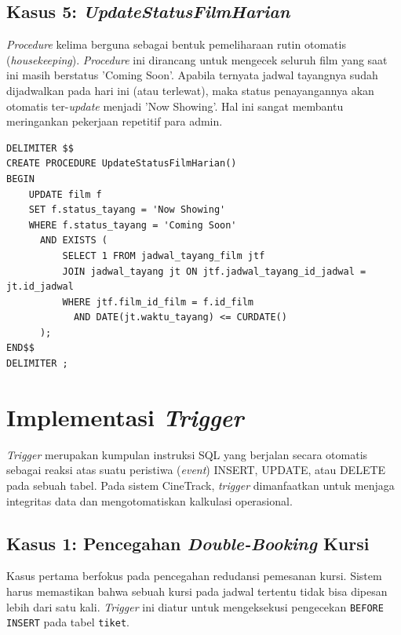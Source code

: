 \documentclass[letter,12pt,bahasa]{article}
\begin{document}
\subsection{Kasus 5: \textit{UpdateStatusFilmHarian}}
\textit{Procedure} kelima berguna sebagai bentuk pemeliharaan rutin otomatis (\textit{housekeeping}). \textit{Procedure} ini dirancang untuk mengecek seluruh film yang saat ini masih berstatus 'Coming Soon'. Apabila ternyata jadwal tayangnya sudah dijadwalkan pada hari ini (atau terlewat), maka status penayangannya akan otomatis ter-\textit{update} menjadi 'Now Showing'. Hal ini sangat membantu meringankan pekerjaan repetitif para admin.

\begin{lstlisting}[style=sql, caption={\textit{Procedure} 5 --- \texttt{UpdateStatusFilmHarian}}, label={lst:proc5}]
DELIMITER $$
CREATE PROCEDURE UpdateStatusFilmHarian()
BEGIN
    UPDATE film f
    SET f.status_tayang = 'Now Showing'
    WHERE f.status_tayang = 'Coming Soon'
      AND EXISTS (
          SELECT 1 FROM jadwal_tayang_film jtf
          JOIN jadwal_tayang jt ON jtf.jadwal_tayang_id_jadwal = jt.id_jadwal
          WHERE jtf.film_id_film = f.id_film 
            AND DATE(jt.waktu_tayang) <= CURDATE()
      );
END$$
DELIMITER ;
\end{lstlisting}

\clearpage

\section{Implementasi \textit{Trigger}}
\textit{Trigger} merupakan kumpulan instruksi SQL yang berjalan secara otomatis sebagai reaksi atas suatu peristiwa (\textit{event}) INSERT, UPDATE, atau DELETE pada sebuah tabel. Pada sistem CineTrack, \textit{trigger} dimanfaatkan untuk menjaga integritas data dan mengotomatiskan kalkulasi operasional.

\subsection{Kasus 1: Pencegahan \textit{Double-Booking} Kursi}
Kasus pertama berfokus pada pencegahan redudansi pemesanan kursi. Sistem harus memastikan bahwa sebuah kursi pada jadwal tertentu tidak bisa dipesan lebih dari satu kali. \textit{Trigger} ini diatur untuk mengeksekusi pengecekan \texttt{BEFORE INSERT} pada tabel \texttt{tiket}.
\end{document}
